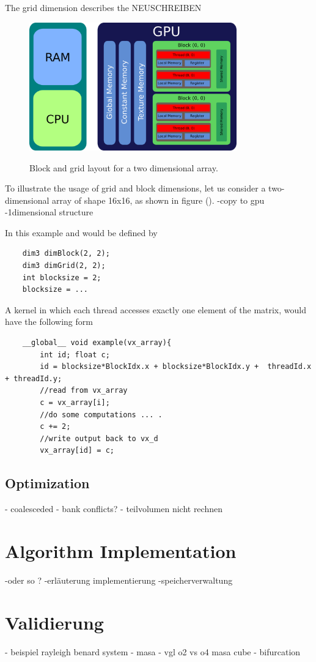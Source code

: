 The grid dimension describes the
NEUSCHREIBEN

\begin{figure}[!tbp]
  \centering
  \includegraphics[width=0.8\textwidth]{gfx/cuda/gpu.png}\label{fig:gpu_grid}
  \caption{Block and grid layout for a two dimensional array.}
\end{figure}

To illustrate the usage of grid and block dimensions, let us consider a two-dimensional array of shape 16x16, as shown in figure ().
-copy to gpu
-1dimensional structure

In this example  and  would be defined by
\begin{verbatim}
    dim3 dimBlock(2, 2);
    dim3 dimGrid(2, 2);
    int blocksize = 2;
    blocksize = ...
\end{verbatim}

A kernel in which each thread accesses exactly one element of the matrix, would have the following form

\begin{verbatim}
    __global__ void example(vx_array){
        int id; float c;
        id = blocksize*BlockIdx.x + blocksize*BlockIdx.y +  threadId.x + threadId.y;
        //read from vx_array
        c = vx_array[i];
        //do some computations ... .
        c += 2;
        //write output back to vx_d
        vx_array[id] = c;
\end{verbatim}

\subsection{Optimization}
- coalesceded
- bank conflicts?
- teilvolumen nicht rechnen
\newpage

\section{Algorithm Implementation}
-oder so ?
-erläuterung  implementierung
-speicherverwaltung


\section{Validierung}
- beispiel rayleigh benard system
- masa
- vgl o2 vs o4 masa cube
- bifurcation

\newpage

